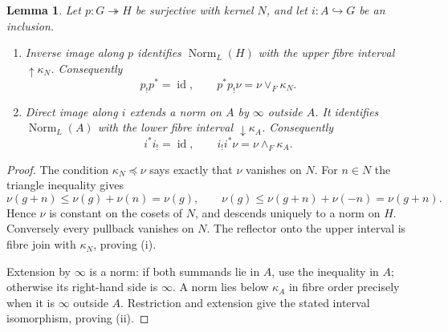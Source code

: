 \documentclass[12pt,a4paper]{amsart}
\newtheorem{lemma}[theorem]{Lemma}
\theoremstyle{definition}
\newcommand{\id}{\operatorname{id}}
\newcommand{\Norm}{\operatorname{Norm}}
\begin{document}
\begin{lemma}\label{lem:intervals}
Let $p:G\twoheadrightarrow H$ be surjective with kernel $N$, and let $i:A\hookrightarrow G$ be an inclusion.
\begin{enumerate}[label=\textup{(\roman*)}]
\item Inverse image along $p$ identifies $\Norm_L(H)$ with the upper fibre interval $\uparrow\kappa_N$. Consequently
\[
                  p_!p^*=\id,\qquad
                  p^*p_!\nu=\nu\vee_F\kappa_N.
\]
\item Direct image along $i$ extends a norm on $A$ by $\infty$ outside $A$. It identifies $\Norm_L(A)$ with the lower fibre interval $\downarrow\kappa_A$. Consequently
\[
                  i^*i_!=\id,\qquad
                  i_!i^*\nu=\nu\wedge_F\kappa_A.
\]
\end{enumerate}
\end{lemma}
\begin{proof}
The condition $\kappa_N\preceq\nu$ says exactly that $\nu$ vanishes on $N$.
For $n\in N$ the triangle inequality gives
\[
 \nu(g+n)\leq\nu(g)+\nu(n)=\nu(g),\qquad
 \nu(g)\leq\nu(g+n)+\nu(-n)=\nu(g+n).
\]
Hence $\nu$ is constant on the cosets of $N$, and descends uniquely to a norm on $H$. Conversely every pullback vanishes on $N$. The reflector onto the upper interval is fibre join with $\kappa_N$, proving (i).

Extension by $\infty$ is a norm: if both summands lie in $A$, use the inequality in $A$; otherwise its right-hand side is $\infty$. A norm lies below $\kappa_A$ in fibre order precisely when it is $\infty$ outside $A$. Restriction and extension give the stated interval isomorphism, proving (ii).
\end{proof}
\end{document}
